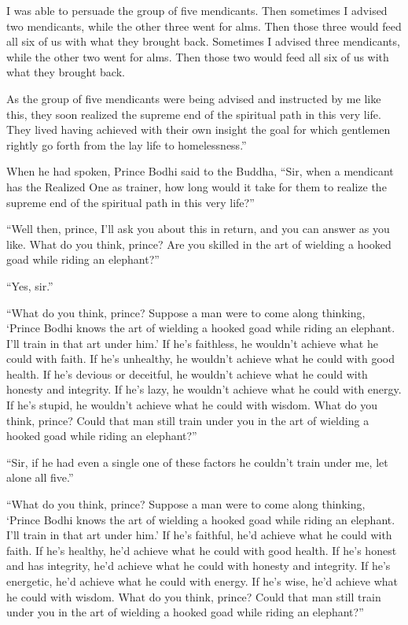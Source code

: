 \documentclass[12pt,openany]{book}%
\begin{document}
I was able to persuade the group of five mendicants. Then sometimes I advised two mendicants, while the other three went for alms. Then those three would feed all six of us with what they brought back. Sometimes I advised three mendicants, while the other two went for alms. Then those two would feed all six of us with what they brought back. 

As the group of five mendicants were being advised and instructed by me like this, they soon realized the supreme end of the spiritual path in this very life. They lived having achieved with their own insight the goal for which gentlemen rightly go forth from the lay life to homelessness.” 

When he had spoken, Prince Bodhi said to the Buddha, “Sir, when a mendicant has the Realized One as trainer, how long would it take for them to realize the supreme end of the spiritual path in this very life?” 

“Well then, prince, I’ll ask you about this in return, and you can answer as you like. What do you think, prince? Are you skilled in the art of wielding a hooked goad while riding an elephant?” 

“Yes, sir.” 

“What do you think, prince? Suppose a man were to come along thinking, ‘Prince Bodhi knows the art of wielding a hooked goad while riding an elephant. I’ll train in that art under him.’ If he’s faithless, he wouldn’t achieve what he could with faith. If he’s unhealthy, he wouldn’t achieve what he could with good health. If he’s devious or deceitful, he wouldn’t achieve what he could with honesty and integrity. If he’s lazy, he wouldn’t achieve what he could with energy. If he’s stupid, he wouldn’t achieve what he could with wisdom. What do you think, prince? Could that man still train under you in the art of wielding a hooked goad while riding an elephant?” 

“Sir, if he had even a single one of these factors he couldn’t train under me, let alone all five.” 

“What do you think, prince? Suppose a man were to come along thinking, ‘Prince Bodhi knows the art of wielding a hooked goad while riding an elephant. I’ll train in that art under him.’ If he’s faithful, he’d achieve what he could with faith. If he’s healthy, he’d achieve what he could with good health. If he’s honest and has integrity, he’d achieve what he could with honesty and integrity. If he’s energetic, he’d achieve what he could with energy. If he’s wise, he’d achieve what he could with wisdom. What do you think, prince? Could that man still train under you in the art of wielding a hooked goad while riding an elephant?” 
\end{document}

